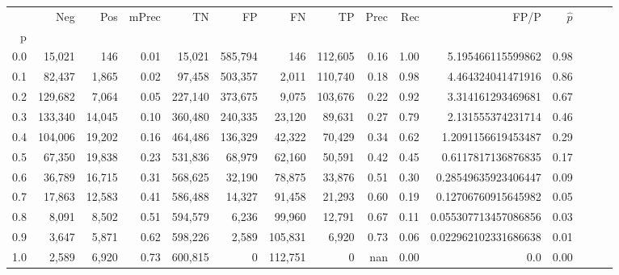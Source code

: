 \begin{tabular}{rrrrrrrrrrrrrrr}
\toprule
{} &      Neg &     Pos & mPrec &       TN &       FP &       FN &       TP &  Prec &   Rec &                  FP/P & $\hat{p}$ \\
p   &          &         &       &          &          &          &          &       &       &                       &           \\
\midrule
0.0 &   15,021 &     146 &  0.01 &   15,021 &  585,794 &      146 &  112,605 &  0.16 &  1.00 &     5.195466115599862 &      0.98 \\
0.1 &   82,437 &   1,865 &  0.02 &   97,458 &  503,357 &    2,011 &  110,740 &  0.18 &  0.98 &     4.464324041471916 &      0.86 \\
0.2 &  129,682 &   7,064 &  0.05 &  227,140 &  373,675 &    9,075 &  103,676 &  0.22 &  0.92 &     3.314161293469681 &      0.67 \\
0.3 &  133,340 &  14,045 &  0.10 &  360,480 &  240,335 &   23,120 &   89,631 &  0.27 &  0.79 &     2.131555374231714 &      0.46 \\
0.4 &  104,006 &  19,202 &  0.16 &  464,486 &  136,329 &   42,322 &   70,429 &  0.34 &  0.62 &    1.2091156619453487 &      0.29 \\
0.5 &   67,350 &  19,838 &  0.23 &  531,836 &   68,979 &   62,160 &   50,591 &  0.42 &  0.45 &    0.6117817136876835 &      0.17 \\
0.6 &   36,789 &  16,715 &  0.31 &  568,625 &   32,190 &   78,875 &   33,876 &  0.51 &  0.30 &   0.28549635923406447 &      0.09 \\
0.7 &   17,863 &  12,583 &  0.41 &  586,488 &   14,327 &   91,458 &   21,293 &  0.60 &  0.19 &   0.12706760915645982 &      0.05 \\
0.8 &    8,091 &   8,502 &  0.51 &  594,579 &    6,236 &   99,960 &   12,791 &  0.67 &  0.11 &  0.055307713457086856 &      0.03 \\
0.9 &    3,647 &   5,871 &  0.62 &  598,226 &    2,589 &  105,831 &    6,920 &  0.73 &  0.06 &  0.022962102331686638 &      0.01 \\
1.0 &    2,589 &   6,920 &  0.73 &  600,815 &        0 &  112,751 &        0 &   nan &  0.00 &                   0.0 &      0.00 \\
\bottomrule
\end{tabular}
